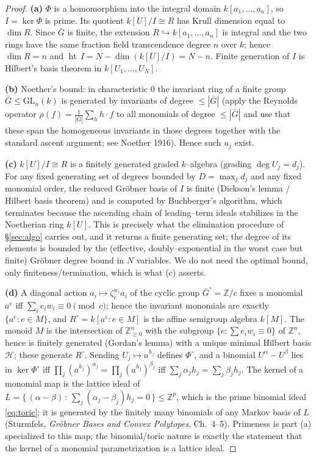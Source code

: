 \documentclass{amsart}
\theoremstyle{definition}
\DeclareMathOperator{\height}{ht}
\begin{document}
\begin{proof}
\textbf{(a)} $\Phi$ is a homomorphism into the integral domain
$k[a_1,\dots,a_n]$, so $I=\ker\Phi$ is prime. Its quotient $k[U]/I\cong R$ has
Krull dimension equal to $\dim R$. Since $\bar G$ is finite, the extension
$R\hookrightarrow k[a_1,\dots,a_n]$ is integral and the two rings have the same
fraction field transcendence degree $n$ over $k$; hence $\dim R=n$ and
$\height\,I=N-\dim(k[U]/I)=N-n$. Finite generation of $I$ is Hilbert's basis
theorem in $k[U_1,\dots,U_N]$.

\textbf{(b)} Noether's bound: in characteristic $0$ the invariant ring of a finite
group $\bar G\le\mathrm{GL}_n(k)$ is generated by invariants of degree
$\le|\bar G|$ (apply the Reynolds operator $\rho(f)=\frac1{|\bar G|}\sum_{h}h\cdot
f$ to all monomials of degree $\le|\bar G|$ and use that these span the homogeneous
invariants in those degrees together with the standard ascent argument; see
Noether 1916). Hence such $u_j$ exist.

\textbf{(c)} $k[U]/I\cong R$ is a finitely generated graded $k$--algebra (grading
$\deg U_j=d_j$). For any fixed generating set of degrees bounded by $D=\max_j d_j$
and any fixed monomial order, the reduced Gr\"obner basis of $I$ is finite (Dickson's
lemma / Hilbert basis theorem) and is computed by Buchberger's algorithm, which
terminates because the ascending chain of leading--term ideals stabilizes in the
Noetherian ring $k[U]$. This is precisely what the elimination procedure of
\S\ref{sec:algo} carries out, and it returns a finite generating set; the degree of
its elements is bounded by the (effective, doubly--exponential in the worst case but
finite) Gr\"obner degree bound in $N$ variables. We do not need the optimal bound,
only finiteness/termination, which is what (c) asserts.

\textbf{(d)} A diagonal action $a_i\mapsto\zeta_c^{w_i}a_i$ of the cyclic group
$\bar G^{\circ}=\mathbb{Z}/c$ fixes a monomial $a^{e}$ iff
$\sum_i e_i w_i\equiv 0\pmod c$; hence the invariant monomials are exactly
$\{a^{e}:e\in M\}$, and $R^{\circ}=k[a^{e}:e\in M]$ is the affine semigroup algebra
$k[M]$. The monoid $M$ is the intersection of $\mathbb{Z}_{\ge0}^n$ with the
subgroup $\{e:\sum e_i w_i\equiv0\}$ of $\mathbb{Z}^n$, hence is finitely generated
(Gordan's lemma) with a unique minimal Hilbert basis $\mathcal H$; these generate
$R^{\circ}$. Sending $U_j\mapsto a^{h_j}$ defines $\Phi^{\circ}$, and a binomial
$U^{\alpha}-U^{\beta}$ lies in $\ker\Phi^{\circ}$ iff
$\prod_j(a^{h_j})^{\alpha_j}=\prod_j(a^{h_j})^{\beta_j}$ iff
$\sum_j\alpha_j h_j=\sum_j\beta_j h_j$. The kernel of a monomial map is the lattice
ideal of $L=\{\,(\alpha-\beta)\,:\,\sum_j(\alpha_j-\beta_j)h_j=0\,\}\le\mathbb{Z}^p$,
which is the prime binomial ideal \eqref{eq:toric}; it is generated by the finitely
many binomials of any Markov basis of $L$ (Sturmfels, \emph{Gr\"obner Bases and
Convex Polytopes}, Ch.~4--5). Primeness is part (a) specialized to this map; the
binomial/toric nature is exactly the statement that the kernel of a monomial
parametrization is a lattice ideal.


\end{proof}
\end{document}
